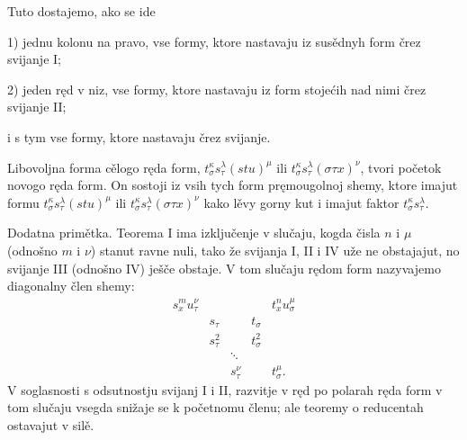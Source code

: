 \documentclass[11pt]{article}
\begin{document}
Tuto dostajemo, ako se ide

1) jednu kolonu na pravo, vse formy, ktore nastavaju iz susědnyh form črez svijanje I;

2) jeden ręd v niz, vse formy, ktore nastavaju iz form stojećih nad nimi črez svijanje II;

i s tym vse formy, ktore nastavaju črez svijanje.

Libovoljna forma cělogo ręda form, $t_\sigma^\kappa s_\tau^\lambda(stu)^\mu$ ili $t_\sigma^\kappa s_\tau^\lambda(\sigma\tau x)^\nu$, tvori početok novogo ręda form. On sostoji iz vsih tych form pręmougolnoj shemy, ktore imajut formu $t_\sigma^\kappa s_\tau^\lambda(stu)^\mu$ ili $t_\sigma^\kappa s_\tau^\lambda(\sigma\tau x)^\nu$ kako lěvy gorny kut i imajut faktor $t_\sigma^\kappa s_\tau^\lambda$.

Dodatna primětka. Teorema I ima izključenje v slučaju, kogda čisla $n$ i $\mu$ (odnošno $m$ i $\nu$) stanut ravne nuli, tako že svijanja I, II i IV uže ne obstajajut, no svijanje III (odnošno IV) ješče obstaje. V tom slučaju rędom form nazyvajemo diagonalny člen shemy:
\[
\begin{array}{ccccc}
s_x^m u_\tau^\nu &&&& t_x^n u_\sigma^\mu\\
& s_\tau && t_\sigma &\\
& s_\tau^2 && t_\sigma^2 &\\
&&\ddots&&\\
&&s_\tau^\nu && t_\sigma^\mu .
\end{array}
\]
V soglasnosti s odsutnostju svijanj I i II, razvitje v ręd po polarah ręda form v tom slučaju vsegda snižaje se k početnomu členu; ale teoremy o reducentah ostavajut v silě.
\end{document}
